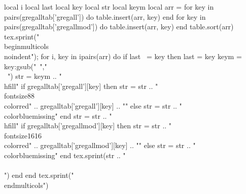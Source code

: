 \documentclass[a4paper]{article}
\begin{document}
\begin{luacode*}
  local i
  local last
  local key
  local str
  local keym
  local arr = {}
  for key in pairs(gregalltab['gregall']) do
    table.insert(arr, key)
  end
  for key in pairs(gregalltab['gregallmod']) do
    table.insert(arr, key)
  end
  table.sort(arr)
  tex.sprint("\\begin{multicols}{3}\\noindent");
  for i, key in ipairs(arr) do
    if last ~= key then
      last = key
      keym = key:gsub("~","\\~{}")
      str = keym .. "\\hfill"
      if gregalltab['gregall'][key] then
        str = str .. "{\\fontsize{8}{8}\\color{red}" .. gregalltab['gregall'][key] .. "}"
      else
        str = str .. "{\\color{blue}missing}"
      end
      str = str .. "\\hfill"
      if gregalltab['gregallmod'][key] then
        str = str .. "{\\fontsize{16}{16}\\color{red}" .. gregalltab['gregallmod'][key] .. "}"
      else
        str = str .. "{\\color{blue}missing}"
      end
      tex.sprint(str .. "\\\\")
    end
  end
  tex.sprint("\\end{multicols}")
\end{luacode*}
\end{document}
